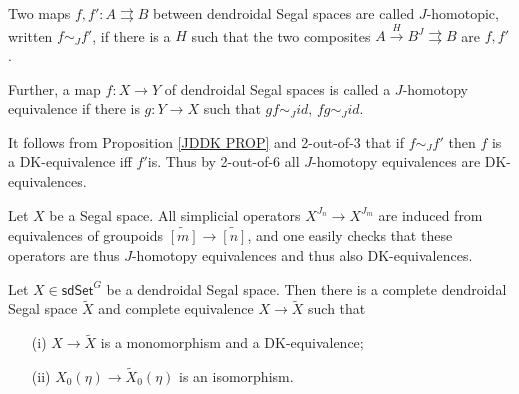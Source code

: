 \documentclass[a4paper,10pt,draft]{article}%
\numberwithin{equation}{section}%
\numberwithin{figure}{section}
\begin{document}
\begin{definition}
	Two maps $f,f'\colon A \rightrightarrows B$ between dendroidal Segal spaces are called $J$-homotopic, written $f \sim_J f'$, if
	there is a $H$ such that
	the two composites
	$A \xrightarrow{H} B^J \rightrightarrows B$
	are $f,f'$.
	
	Further, a map $f\colon X \to Y$ of dendroidal Segal spaces is called a $J$-homotopy equivalence if there is $g \colon Y \to X$
	such that $gf \sim_J id$, $fg \sim_J id$.
\end{definition}

\begin{remark}
	It follows from Proposition \ref{JDDK PROP} and 2-out-of-3 that if 
	$f\sim_J f'$ then $f$ is a DK-equivalence iff $f'$is.
	Thus by 2-out-of-6 all $J$-homotopy equivalences are DK-equivalences.
\end{remark}

\begin{remark}\label{ALLXJK REM}
	Let $X$ be a Segal space. All simplicial operators
	$X^{J_n} \to X^{J_m}$ are induced from equivalences of groupoids $\widetilde{[m]} \to \widetilde{[n]}$, and one easily checks that these operators are thus $J$-homotopy equivalences and thus also DK-equivalences.
\end{remark}


\begin{proposition}\label{COMPLE PROP}
Let $X \in \mathsf{sdSet}^G$ be a dendroidal Segal space. 
Then there is a complete dendroidal Segal space $\tilde{X}$
and complete equivalence $X \to \tilde{X}$ such that
\begin{itemize}
	\item[(i)] $X \to \tilde{X}$ is a monomorphism and a DK-equivalence;
	\item[(ii)] $X_0(\eta) \to \tilde{X}_0(\eta)$ is an isomorphism.
\end{itemize}
\end{proposition}
\end{document}
